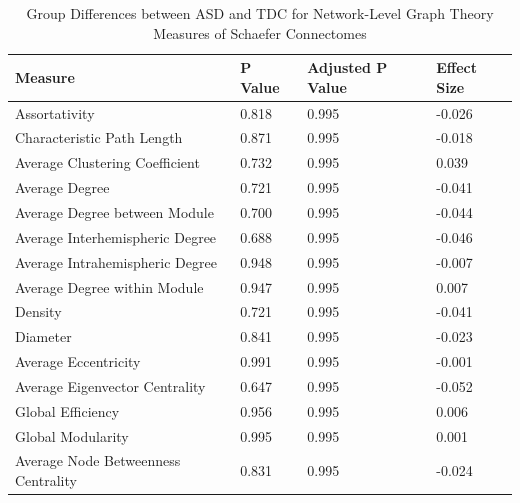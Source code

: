 \documentclass[11pt,conference]{IEEEtran}
\begin{document}
    \begin{table}
        \caption{Group Differences between ASD and TDC for Network-Level Graph Theory
                    Measures of Schaefer Connectomes}
        \begin{center}
            \begin{tabular}{p{4cm}p{1cm}p{1cm}p{1cm}}
                \toprule
                                            Measure &  P Value &  Adjusted P Value &  Effect Size \\
                \midrule
                                        Assortativity &    0.818 &             0.995 &       -0.026 \\
                            Characteristic Path Length &    0.871 &             0.995 &       -0.018 \\
                        Average Clustering Coefficient &    0.732 &             0.995 &        0.039 \\
                                        Average Degree &    0.721 &             0.995 &       -0.041 \\
                        Average Degree between Module &    0.700 &             0.995 &       -0.044 \\
                    Average Interhemispheric Degree &    0.688 &             0.995 &       -0.046 \\
                    Average Intrahemispheric Degree &    0.948 &             0.995 &       -0.007 \\
                        Average Degree within Module &    0.947 &             0.995 &        0.007 \\
                                            Density &    0.721 &             0.995 &       -0.041 \\
                                            Diameter &    0.841 &             0.995 &       -0.023 \\
                                Average Eccentricity &    0.991 &             0.995 &       -0.001 \\
                        Average Eigenvector Centrality &    0.647 &             0.995 &       -0.052 \\
                                    Global Efficiency &    0.956 &             0.995 &        0.006 \\
                                    Global Modularity &    0.995 &             0.995 &        0.001 \\
                Average Node Betweenness Centrality &    0.831 &             0.995 &       -0.024 \\

\end{tabular}
\end{center}
\end{table}
\end{document}
